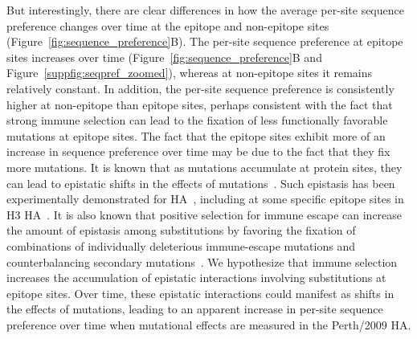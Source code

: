 \documentclass[9pt,twocolumn,twoside]{pnas-new}
\begin{document}
But interestingly, there are clear differences in how the average per-site sequence preference changes over time at the epitope and non-epitope sites (Figure~\ref{fig:sequence_preference}B).
The per-site sequence preference at epitope sites increases over time (Figure~\ref{fig:sequence_preference}B and Figure~\ref{suppfig:seqpref_zoomed}), whereas at non-epitope sites it remains relatively constant.
In addition, the per-site sequence preference is consistently higher at non-epitope than epitope sites, perhaps consistent with the fact that strong immune selection can lead to the fixation of less functionally favorable mutations at epitope sites.
The fact that the epitope sites exhibit more of an increase in sequence preference over time may be due to the fact that they fix more mutations.
It is known that as mutations accumulate at protein sites, they can lead to epistatic shifts in the effects of mutations~\cite{gong2013stability,natarajan2013epistasis,harms2014historical,starr2016epistasis,starr2017alternative,haddox2017mapping}.
Such epistasis has been experimentally demonstrated for HA~\cite{das2013defining,myers2013compensatory}, including at some specific epitope sites in H3 HA~\cite{wu2017diversity}.
It is also known that positive selection for immune escape can increase the amount of epistasis among substitutions by favoring the fixation of combinations of individually deleterious immune-escape mutations and counterbalancing secondary mutations~\cite{gong2014epistatically}.
We hypothesize that immune selection increases the accumulation of epistatic interactions involving substitutions at epitope sites.
Over time, these epistatic interactions could manifest as shifts in the effects of mutations, leading to an apparent increase in per-site sequence preference over time when mutational effects are measured in the Perth/2009 HA.
\end{document}
